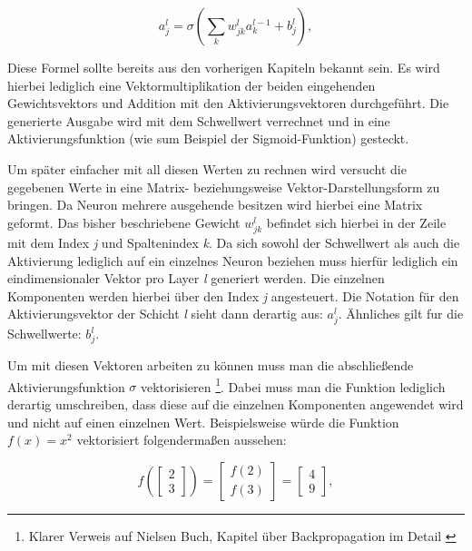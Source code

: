 \begin{equation} \label{eq:act}
a^{l}_j = \sigma\left( \sum_k w^{l}_{jk} a^{l-1}_k + b^l_j \right),
\end{equation}

Diese Formel sollte bereits aus den vorherigen Kapiteln bekannt sein. Es wird hierbei lediglich eine Vektormultiplikation der beiden eingehenden Gewichtsvektors und Addition mit den Aktivierungsvektoren durchgeführt. Die generierte Ausgabe wird mit dem Schwellwert verrechnet und in eine Aktivierungsfunktion (wie sum Beispiel der Sigmoid-Funktion) gesteckt.

Um später einfacher mit all diesen Werten zu rechnen wird versucht die gegebenen Werte in eine Matrix- beziehungsweise Vektor-Darstellungsform zu bringen. Da Neuron mehrere ausgehende  besitzen wird hierbei eine Matrix geformt. Das bisher beschriebene Gewicht $w^l_{jk}$ befindet sich hierbei in der Zeile mit dem Index \emph{j} und Spaltenindex \emph{k}. Da sich sowohl der Schwellwert als auch die Aktivierung lediglich auf ein einzelnes Neuron beziehen muss hierfür lediglich ein eindimensionaler Vektor pro Layer \emph{l} generiert werden. Die einzelnen Komponenten werden hierbei über den Index \emph{j} angesteuert. Die Notation für den Aktivierungsvektor der Schicht \emph{l} sieht dann derartig aus: $a^l_j$. Ähnliches gilt fur die Schwellwerte: $b^l_j$. 

Um mit diesen Vektoren arbeiten zu können muss man die abschließende Aktivierungsfunktion $\sigma$ vektorisieren 
\footnote{Klarer Verweis auf Nielsen Buch, Kapitel über Backpropagation im Detail \cite{dlnielsen}}. 
Dabei muss man die Funktion lediglich derartig umschreiben, dass diese auf die einzelnen Komponenten angewendet wird und nicht auf einen einzelnen Wert. Beispielsweise würde die Funktion $f(x) = x^2$ vektorisiert folgendermaßen aussehen: 

\begin{equation}
  f\left(\left[ \begin{array}{c} 2 \\ 3 \end{array} \right] \right)
  = \left[ \begin{array}{c} f(2) \\ f(3) \end{array} \right]
  = \left[ \begin{array}{c} 4 \\ 9 \end{array} \right],
\end{equation}

